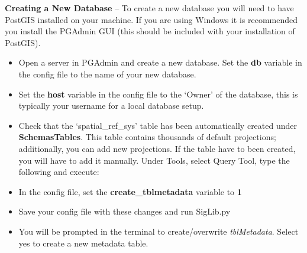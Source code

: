 \documentclass[letterpaper,10pt,openany,oneside]{sphinxmanual}
\begin{document}

\textbf{Creating a New Database} -- To create a new database you will need to
have PostGIS installed on your machine. If you are using Windows it is
recommended you install the PGAdmin GUI (this should be included with
your installation of PostGIS).
\begin{itemize}
\item {} 
Open a server in PGAdmin and create a new database. Set the \textbf{db}
variable in the config file to the name of your new database.

\item {} 
Set the \textbf{host} variable in the config file to the `Owner' of the
database, this is typically your username for a local database setup.

\item {} 
Check that the `spatial\_ref\_sys' table has been automatically
created under \textbf{Schemas\textbar{}Tables}. This table contains thousands of
default projections; additionally, you can add new
projections. If the table have to
been created, you will have to add it manually. Under Tools, select
Query Tool, type the following and execute:

\end{itemize}

\begin{itemize}
\item {} 
In the config file, set the \textbf{create\_tblmetadata} variable to \textbf{1}

\item {} 
Save your config file with these changes and run SigLib.py

\end{itemize}

\begin{itemize}
\item {} 
You will be prompted in the terminal to create/overwrite
\emph{tblMetadata}. Select yes to create a new metadata table.

\end{itemize}
\end{document}

